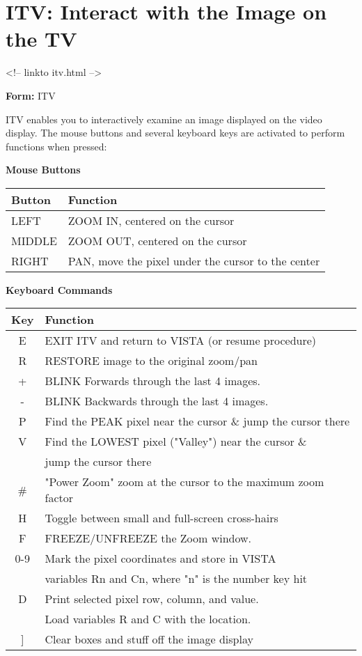 \section{ITV: Interact with the Image on the TV}
\begin{rawhtml}
<!-- linkto itv.html -->
\end{rawhtml}
\begin{command}
  \item[\textbf{Form: }ITV\hfill]{}
\end{command}

ITV enables you to interactively examine an image displayed on the video
display.  The mouse buttons and several keyboard keys are activated to
perform functions when pressed:

\begin{center}
{\bf Mouse Buttons}\\
\begin{tabular}{ll}
\hline
Button & Function\\
\hline
LEFT  &ZOOM IN, centered on the cursor\\
MIDDLE&ZOOM OUT, centered on the cursor\\
RIGHT &PAN, move the pixel under the cursor to the center\\
\hline
\end{tabular}
\end{center}

\begin{center}
{\bf Keyboard Commands}\\
\begin{tabular}{cl}
\hline
Key & Function\\
\hline
 E &EXIT ITV and return to VISTA (or resume procedure)\\
 R &RESTORE image to the original zoom/pan\\
 + &BLINK Forwards through the last 4 images.\\
 - &BLINK Backwards through the last 4 images.\\
 P &Find the PEAK pixel near the cursor \& jump the cursor there\\
 V &Find the LOWEST pixel ("Valley") near the cursor \& \\
   &jump the cursor there\\
 \# &"Power Zoom" zoom at the cursor to the maximum zoom factor\\
 H &Toggle between small and full-screen cross-hairs\\
 F &FREEZE/UNFREEZE the Zoom window.\\
0-9&Mark the pixel coordinates and store in VISTA\\
   &variables Rn and Cn, where "n" is the number key hit\\
 D &Print selected pixel row, column, and value.\\
   &Load variables R and C with the location.\\
 ] &Clear boxes and stuff off the image display\\
\hline
\end{tabular}
\end{center}

